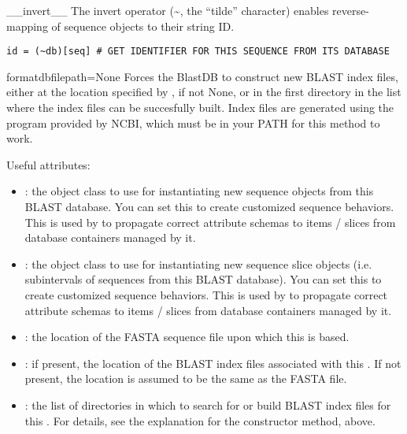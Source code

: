 \documentclass{howto}
\begin{document}
\begin{funcdesc}{__invert__}{}
  The invert operator (\textasciitilde, the ``tilde'' character) 
  enables reverse-mapping of sequence objects to their string ID.
\begin{verbatim}
id = (~db)[seq] # GET IDENTIFIER FOR THIS SEQUENCE FROM ITS DATABASE
\end{verbatim}
\end{funcdesc}

\begin{funcdesc}{formatdb}{filepath=None}
  Forces the BlastDB to construct new BLAST index files, either at the
  location specified by , if not None, or in the first
  directory in the  list where the index files
  can be succesfully built.  Index files are generated using the 
   program provided by NCBI, which must be in your
  PATH for this method to work.
\end{funcdesc}



Useful attributes:
\begin{itemize}

\item
{}: the object class to use for instantiating new sequence objects from this BLAST database.  You can set this to create customized sequence behaviors.  
This is used by  to propagate correct attribute schemas to
items / slices from database containers managed by it.

\item
{}: the object class to use for instantiating new sequence slice objects (i.e. subintervals of sequences from this BLAST database).  You can set this to create customized sequence behaviors.
This is used by  to propagate correct attribute schemas to
items / slices from database containers managed by it.

\item
{}: the location of the FASTA sequence file upon which
this  is based.

\item
{}: if present, the location of the BLAST index files
associated with this .  If not present, the location is assumed
to be the same as the FASTA file.

\item
{}: the list of directories in which to search for
or build BLAST index files for this .  For details, see
the explanation for the constructor method, above.

\end{itemize}
\end{document}
